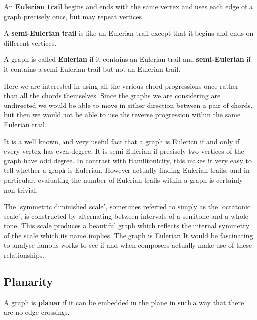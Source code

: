 \documentclass[]{tMAM2e}
\begin{document}
\begin{definition} An \textbf{Eulerian trail} begins and ends with the same vertex and uses each edge of a graph precisely once, but may repeat vertices.
\end{definition}

\begin{definition} A \textbf{semi-Eulerian trail} is like an Eulerian trail except that it begins and ends on different vertices.
\end{definition}

\begin{definition} A graph is called \textbf{Eulerian} if it contains an Eulerian trail and \textbf{semi-Eulerian} if it contains a semi-Eulerian trail but not an Eulerian trail.
\end{definition}

Here we are interested in using all the various chord progressions once rather than all the chords themselves. Since the graphs we are considering are undirected we would be able to move in either direction between a pair of chords, but then we would not be able to use the reverse progression within the same Eulerian trail.

It is a well known, and very useful fact that a graph is Eulerian if and only if every vertex has even degree. It is semi-Eulerian if precisely two vertices of the graph have odd degree. In contrast with Hamiltonicity, this makes it very easy to tell whether a graph is Eulerian. However actually finding Eulerian trails, and in particular, evaluating the number of Eulerian trails within a graph is certainly non-trivial.

The `symmetric diminished scale', sometimes referred to simply as the `octatonic scale', is constructed by alternating between intervals of a semitone and a whole tone. This scale produces a beautiful graph which reflects the internal symmetry of the scale which its name implies. The graph is Eulerian 
It would be fascinating to analyse famous works to see if and when composers actually make use of these relationships.



\subsection{Planarity}

\begin{definition}
A graph is \textbf{planar} if it can be embedded in the plane in such a way that there are no edge crossings.
\end{definition}
\end{document}
